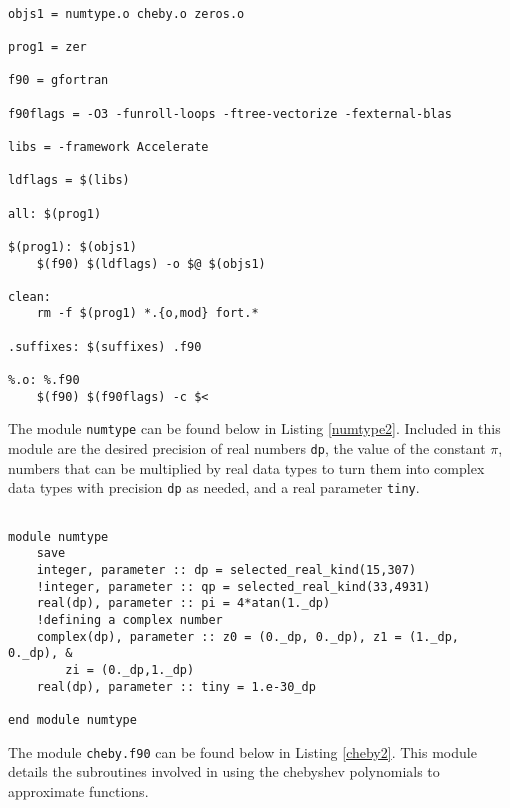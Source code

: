 \documentclass[12pt]{article}
\begin{document}
\begin{lstlisting}[frame=single,caption={{\tt Makefile}},label=makefile2]

objs1 = numtype.o cheby.o zeros.o

prog1 = zer

f90 = gfortran

f90flags = -O3 -funroll-loops -ftree-vectorize -fexternal-blas

libs = -framework Accelerate

ldflags = $(libs)

all: $(prog1)

$(prog1): $(objs1)
	$(f90) $(ldflags) -o $@ $(objs1)

clean: 
	rm -f $(prog1) *.{o,mod} fort.*

.suffixes: $(suffixes) .f90

%.o: %.f90
	$(f90) $(f90flags) -c $<

\end{lstlisting}

The module {\tt numtype} can be found below in Listing \ref{numtype2}.  Included in this module are the desired precision of real numbers {\tt dp}, the value of the constant $\pi$, numbers that can be multiplied by real data types to turn them into complex data types with precision {\tt dp} as needed, and a real parameter {\tt tiny}.

\begin{lstlisting}[frame=single,caption={{\tt Fortran 90} Module {\tt numtype.f90}},label=numtype2]

module numtype
    save
    integer, parameter :: dp = selected_real_kind(15,307)
    !integer, parameter :: qp = selected_real_kind(33,4931)
    real(dp), parameter :: pi = 4*atan(1._dp)
    !defining a complex number
    complex(dp), parameter :: z0 = (0._dp, 0._dp), z1 = (1._dp, 0._dp), &
        zi = (0._dp,1._dp)
    real(dp), parameter :: tiny = 1.e-30_dp

end module numtype

\end{lstlisting}

The module {\tt cheby.f90} can be found below in Listing \ref{cheby2}.  This module details the subroutines involved in using the chebyshev polynomials to approximate functions.
\end{document}
